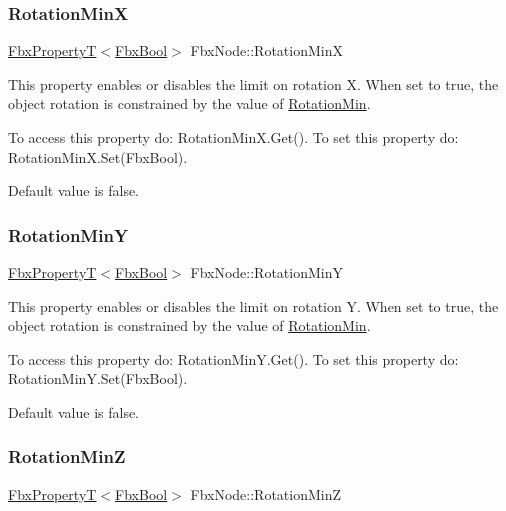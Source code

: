 \subsubsection{\texorpdfstring{Rotation\+MinX}{RotationMinX}}
{\footnotesize\ttfamily \hyperlink{class_fbx_property_t}{Fbx\+PropertyT}$<$\hyperlink{fbxtypes_8h_a92e0562b2fe33e76a242f498b362262e}{Fbx\+Bool}$>$ Fbx\+Node\+::\+Rotation\+MinX}

This property enables or disables the limit on rotation X. When set to {\ttfamily true}, the object rotation is constrained by the value of \hyperlink{class_fbx_node_a186dc96c347a68ff32eb1641f02c70c8}{Rotation\+Min}.

To access this property do\+: Rotation\+Min\+X.\+Get(). To set this property do\+: Rotation\+Min\+X.\+Set(\+Fbx\+Bool).

Default value is false. \mbox{\label{class_fbx_node_aa1e032cbdaad4bac9ef9dbc6efe3fcea}} 
\subsubsection{\texorpdfstring{Rotation\+MinY}{RotationMinY}}
{\footnotesize\ttfamily \hyperlink{class_fbx_property_t}{Fbx\+PropertyT}$<$\hyperlink{fbxtypes_8h_a92e0562b2fe33e76a242f498b362262e}{Fbx\+Bool}$>$ Fbx\+Node\+::\+Rotation\+MinY}

This property enables or disables the limit on rotation Y. When set to {\ttfamily true}, the object rotation is constrained by the value of \hyperlink{class_fbx_node_a186dc96c347a68ff32eb1641f02c70c8}{Rotation\+Min}.

To access this property do\+: Rotation\+Min\+Y.\+Get(). To set this property do\+: Rotation\+Min\+Y.\+Set(\+Fbx\+Bool).

Default value is false. \mbox{\label{class_fbx_node_ab78b8c903c7104974ff2567dbc43f3cf}} 
\subsubsection{\texorpdfstring{Rotation\+MinZ}{RotationMinZ}}
{\footnotesize\ttfamily \hyperlink{class_fbx_property_t}{Fbx\+PropertyT}$<$\hyperlink{fbxtypes_8h_a92e0562b2fe33e76a242f498b362262e}{Fbx\+Bool}$>$ Fbx\+Node\+::\+Rotation\+MinZ}

